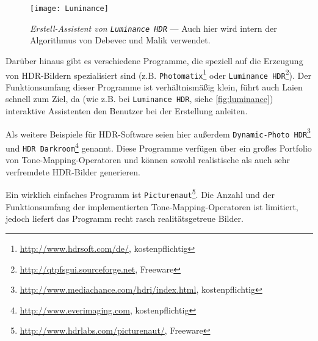 \begin{figure}
  \begin{center}
    \texttt{[image: Luminance]}
    \caption{\textit{Erstell-Assistent von \texttt{Luminance HDR}} --- Auch hier wird intern der Algorithmus von Debevec und Malik verwendet.}
    \label{fig:luminance}
  \end{center}
\end{figure}

Darüber hinaus gibt es verschiedene Programme, die speziell auf die Erzeugung von \gls{HDR}-Bildern spezialisiert sind (z.B. \texttt{Photomatix}\footnote{\url{http://www.hdrsoft.com/de/}, kostenpflichtig} oder \texttt{Luminance HDR}\footnote{\url{http://qtpfsgui.sourceforge.net}, Freeware}). Der Funktionsumfang dieser Programme ist verhältnismäßig klein, führt auch Laien schnell zum Ziel, da (wie z.B. bei \texttt{Luminance HDR}, siehe \autoref{fig:luminance}) interaktive Assistenten den Benutzer bei der Erstellung anleiten. 

Als weitere Beispiele für \gls{HDR}-Software seien hier außerdem \texttt{Dynamic-Photo HDR}\footnote{\url{http://www.mediachance.com/hdri/index.html}, kostenpflichtig} und \texttt{HDR Darkroom}\footnote{\url{http://www.everimaging.com}, kostenpflichtig} genannt. Diese Programme verfügen über ein großes Portfolio von \gls{Tone-Mapping}-Operatoren und können sowohl realistische als auch sehr verfremdete \gls{HDR}-Bilder generieren. 

Ein wirklich einfaches Programm ist \texttt{Picturenaut}\footnote{\url{http://www.hdrlabs.com/picturenaut/}, Freeware}. Die Anzahl und der Funktionsumfang der implementierten \gls{Tone-Mapping}-Operatoren ist limitiert, jedoch liefert das Programm recht rasch realitätsgetreue Bilder.


